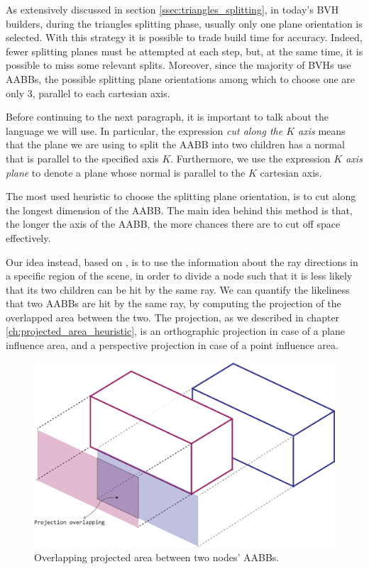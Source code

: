 \documentclass{PoliMi_MasterThesis}
\begin{document}
As extensively discussed in section \ref{ssec:triangles_splitting}, in today's BVH builders, during the triangles splitting phase, usually only one plane orientation is selected. With this strategy it is possible to trade build time for accuracy. Indeed, fewer splitting planes must be attempted at each step, but, at the same time, it is possible to miss some relevant splits. Moreover, since the majority of BVHs use AABBs, the possible splitting plane orientations among which to choose one are only 3, parallel to each cartesian axis.

Before continuing to the next paragraph, it is important to talk about the language we will use. In particular, the expression \textit{cut along the $K$ axis} means that the plane we are using to split the AABB into two children has a normal that is parallel to the specified axis $K$. Furthermore, we use the expression \textit{$K$ axis plane} to denote a plane whose normal is parallel to the $K$ cartesian axis.

The most used heuristic to choose the splitting plane orientation, is to cut along the longest dimension of the AABB. The main idea behind this method is that, the longer the axis of the AABB, the more chances there are to cut off space effectively.

Our idea instead, based on \cite{bvh_overlapping_metric}, is to use the information about the ray directions in a specific region of the scene, in order to divide a node such that it is less likely that its two children can be hit by the same ray. We can quantify the likeliness that two AABBs are hit by the same ray, by computing the projection of the overlapped area between the two. The projection, as we described in chapter \ref{ch:projected_area_heuristic}, is an orthographic projection in case of a plane influence area, and a perspective projection in case of a point influence area.

\begin{figure}[H]
    \centering
    \includegraphics[width=\textwidth*\real{0.6}]{Images/projection_overlapping.png}
    \caption{Overlapping projected area between two nodes' AABBs.}
    \label{fig:overlapping_projected_area}
\end{figure}
\end{document}

